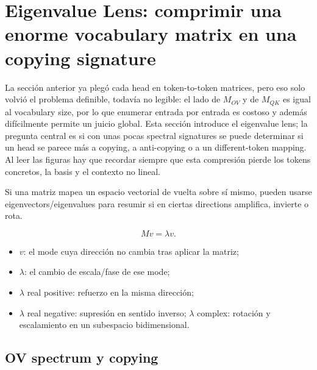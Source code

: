 \section{Eigenvalue Lens: comprimir una enorme vocabulary matrix en una copying signature}

La sección anterior ya plegó cada head en token-to-token matrices, pero eso solo volvió el problema definible, todavía no legible: el lado de $M_{OV}$ y de $M_{QK}$ es igual al vocabulary size, por lo que enumerar entrada por entrada es costoso y además difícilmente permite un juicio global. Esta sección introduce el eigenvalue lens; la pregunta central es si con unas pocas spectral signatures se puede determinar si un head se parece más a copying, a anti-copying o a un different-token mapping. Al leer las figuras hay que recordar siempre que esta compresión pierde los tokens concretos, la basis y el contexto no lineal.

Si una matriz mapea un espacio vectorial de vuelta sobre sí mismo, pueden usarse eigenvectors/eigenvalues para resumir si en ciertas directions amplifica, invierte o rota.


\[
Mv=\lambda v.
\]

\begin{itemize}
  \item $v$: el mode cuya dirección no cambia tras aplicar la matriz;
  \item $\lambda$: el cambio de escala/fase de ese mode;
  \item $\lambda$ real positive: refuerzo en la misma dirección;
  \item $\lambda$ real negative: supresión en sentido inverso; $\lambda$ complex: rotación y escalamiento en un subespacio bidimensional.
\end{itemize}


\subsection{OV spectrum y copying}


